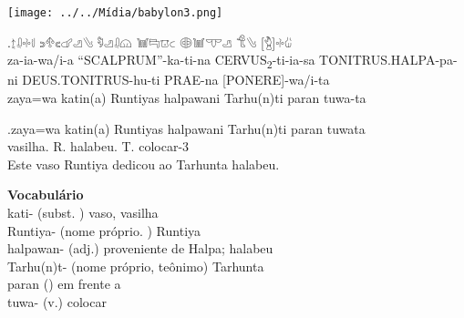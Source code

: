 \clearpage

\begin{center}
	\texttt{[image: ../../Mídia/babylon3.png]}
\end{center}
\exg.{\Large 𔖪𔓱𔗬𔗷} {\Large 𔗎𔔯𔗏𔗧𔑣𔐤} {\Large 𔑵𔑣𔓱𔗔} {\Large 𔓢𔑞𔕸𔗐} {\Large 𔖖𔓢𔕙𔑣}
{\Large 𔐎𔐤} {\Large [𔑇]𔗬𔑰}\\
za-ia-wa\slash{}i-a\hspace{10pt} ``SCALPRUM''-ka-ti-na\hspace{10pt}
CERVUS\textsubscript{2}-ti-ia-sa\hspace{10pt} TONITRUS.HALPA-pa-ni\hspace{10pt}
DEUS.TONITRUS-hu-ti\hspace{10pt} PRAE-na\hspace{10pt} [PONERE]-wa/i-ta\\
zaya=wa katin{(a)} Runtiyas halpawani Tarhu{(n)}ti paran tuwa-ta

\exg.zaya=wa katin{(a)} Runtiyas halpawani Tarhu{(n)}ti paran tuwata\\
\Det{}\Acu{} vasilha.\Neut{}\Acu{} R.\Com{}\Nom{} halabeu.\Dat{} T.\Dat{} \Prep{} colocar-3\Sg\\
Este vaso Runtiya dedicou ao Tarhunta halabeu.


\noindent\textbf{Vocabulário}\\
\noindent kati- (subst. \Neut) vaso, vasilha\\
Runtiya- (nome próprio. \Com) Runtiya\\
halpawan- (adj.) proveniente de Halpa; halabeu\\
Tarhu{(n)}t- (nome próprio, teônimo) Tarhunta\\
paran (\Prep) em frente a\\
tuwa- (v.) colocar
